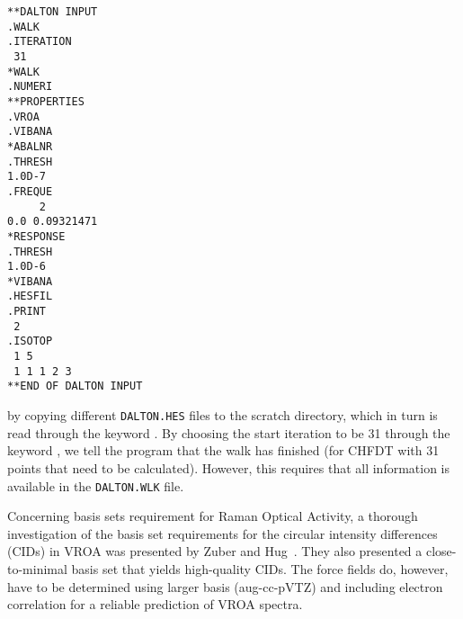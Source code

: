 \begin{verbatim}
**DALTON INPUT
.WALK
.ITERATION
 31
*WALK
.NUMERI
**PROPERTIES
.VROA
.VIBANA
*ABALNR
.THRESH
1.0D-7
.FREQUE
     2
0.0 0.09321471
*RESPONSE
.THRESH
1.0D-6
*VIBANA
.HESFIL
.PRINT
 2
.ISOTOP
 1 5
 1 1 1 2 3
**END OF DALTON INPUT
\end{verbatim}
by copying different \verb|DALTON.HES| files to the scratch
directory, which in turn is read through the keyword . By
choosing the start iteration to be 31 through the keyword
, we tell the program that the walk has finished (for
CHFDT with 31 points that need to be calculated). However, this
requires that all information is available in the \verb|DALTON.WLK|
file.

Concerning basis sets requirement for Raman Optical Activity, a
thorough investigation of the basis set requirements for the circular
intensity differences (CIDs) in VROA was presented by Zuber and
Hug~\cite{gzwhjpca108}. They also presented a close-to-minimal basis
set that yields high-quality CIDs. The force fields do, however, have
to be determined using larger basis (aug-cc-pVTZ) and including
electron correlation for a reliable prediction of VROA spectra.
